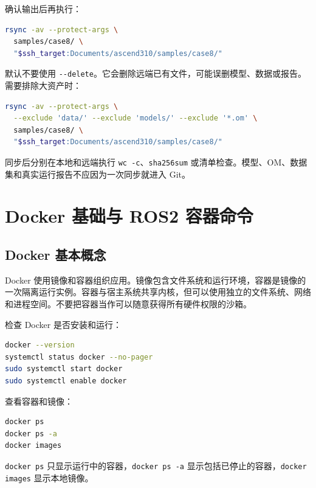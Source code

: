 确认输出后再执行：

\begin{lstlisting}[language=bash]
rsync -av --protect-args \
  samples/case8/ \
  "$ssh_target:Documents/ascend310/samples/case8/"
\end{lstlisting}

默认不要使用
\passthrough{\lstinline!--delete!}。它会删除远端已有文件，可能误删模型、数据或报告。需要排除大资产时：

\begin{lstlisting}[language=bash]
rsync -av --protect-args \
  --exclude 'data/' --exclude 'models/' --exclude '*.om' \
  samples/case8/ \
  "$ssh_target:Documents/ascend310/samples/case8/"
\end{lstlisting}

同步后分别在本地和远端执行
\passthrough{\lstinline!wc -c!}、\passthrough{\lstinline!sha256sum!}
或清单检查。模型、OM、数据集和真实运行报告不应因为一次同步就进入 Git。

\section{Docker 基础与 ROS2
容器命令}\label{docker-ux57faux7840ux4e0e-ros2-ux5bb9ux5668ux547dux4ee4}

\subsection{Docker 基本概念}\label{docker-ux57faux672cux6982ux5ff5}

Docker
使用镜像和容器组织应用。镜像包含文件系统和运行环境，容器是镜像的一次隔离运行实例。容器与宿主系统共享内核，但可以使用独立的文件系统、网络和进程空间。不要把容器当作可以随意获得所有硬件权限的沙箱。

检查 Docker 是否安装和运行：

\begin{lstlisting}[language=bash]
docker --version
systemctl status docker --no-pager
sudo systemctl start docker
sudo systemctl enable docker
\end{lstlisting}

查看容器和镜像：

\begin{lstlisting}[language=bash]
docker ps
docker ps -a
docker images
\end{lstlisting}

\passthrough{\lstinline!docker ps!}
只显示运行中的容器，\passthrough{\lstinline!docker ps -a!}
显示包括已停止的容器，\passthrough{\lstinline!docker images!}
显示本地镜像。

